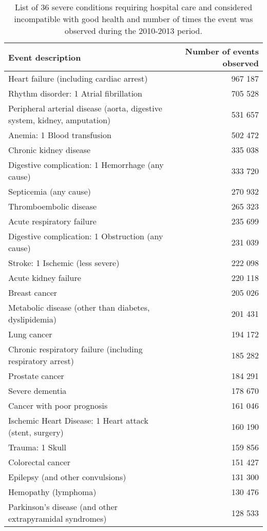 \documentclass[risks,article,submit,moreauthors,pdftex]{Definitions/mdpi}
\begin{document}
\begin{table}

\caption{\label{tab:pathol}List of 36 severe conditions requiring hospital care and considered incompatible with good health and number of times the event was observed during the 2010-2013 period.}
\centering
\begin{tabular}[t]{>{\raggedright\arraybackslash}p{20em}r}
\toprule
Event description & Number of events observed\\
\midrule
Heart failure (including cardiac arrest) & 967 187\\
Rhythm disorder: 1 Atrial fibrillation & 705 528\\
Peripheral arterial disease (aorta, digestive system, kidney, amputation) & 531 657\\
Anemia: 1 Blood transfusion & 502 472\\
Chronic kidney disease & 335 038\\
Digestive complication: 1 Hemorrhage (any cause) & 333 720\\
Septicemia (any cause) & 270 932\\
Thromboembolic disease & 265 323\\
Acute respiratory failure & 235 699\\
Digestive complication: 1 Obstruction (any cause) & 231 039\\
Stroke: 1 Ischemic (less severe) & 222 098\\
Acute kidney failure & 220 118\\
Breast cancer & 205 026\\
Metabolic disease (other than diabetes, dyslipidemia) & 201 431\\
Lung cancer & 194 172\\
Chronic respiratory failure (including respiratory arrest) & 185 282\\
Prostate cancer & 184 291\\
Severe dementia & 178 670\\
Cancer with poor prognosis & 161 046\\
Ischemic Heart Disease: 1 Heart attack (stent, surgery) & 160 190\\
Trauma: 1 Skull & 159 856\\
Colorectal cancer & 151 427\\
Epilepsy (and other convulsions) & 131 300\\
Hemopathy (lymphoma) & 130 476\\
Parkinson's disease (and other extrapyramidal syndromes) & 128 533\\

\end{tabular}
\end{table}
\end{document}
